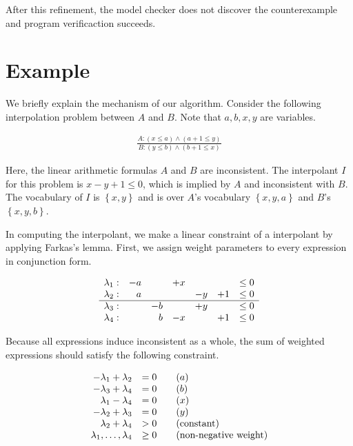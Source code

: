 After this refinement, the model checker does not discover the
counterexample and program verificaction succeeds.

\section{Example}

We briefly explain the mechanism of our algorithm. Consider the
following interpolation problem between $A$ and $B$. Note that
$a,b,x,y$ are variables.

\begin{align*}
\frac
{A: (x \leq a) \wedge (a + 1 \leq y)}
{B: (y \leq b) \wedge (b + 1 \leq x)}
\end{align*}

Here, the linear arithmetic formulas $A$ and $B$ are inconsistent.  The
interpolant $I$ for this problem is $x-y+1 \leq 0$, which is implied by
$A$ and inconsistent with $B$.  The vocabulary of $I$ is $\left\lbrace
x,y \right\rbrace$ and is over $A$'s vocabulary $\left\lbrace x,y,a
\right\rbrace$ and $B$'s $\left\lbrace x,y,b \right\rbrace$.

In computing the interpolant, we make a linear constraint of a
interpolant by applying Farkas's lemma.  First, we assign weight
parameters to every expression in conjunction form.

\begin{align*}
\begin{array}{r r r r r r l}
\lambda_1 : & -a & & +x & & & \leq 0 \\
\lambda_2 : & a & & & -y & +1 & \leq 0 \\
\hline
\lambda_3 : & & -b & & +y & & \leq 0 \\
\lambda_4 : & & b & -x & & +1 & \leq 0
\end{array}
\end{align*}

Because all expressions induce inconsistent as a whole, the sum of
weighted expressions should satisfy the following constraint.

\begin{align*}
\begin{array}{r l l}
- \lambda_1 + \lambda_2 & = 0 \quad & (a) \\
- \lambda_3 + \lambda_4 & = 0 & (b) \\
  \lambda_1 - \lambda_4 & = 0 & (x) \\
- \lambda_2 + \lambda_3 & = 0 & (y) \\
  \lambda_2 + \lambda_4 & > 0 & (\text{constant}) \\
\lambda_1, \ldots, \lambda_4 & \geq 0 & (\text{non-negative weight})
\end{array}
\end{align*}


